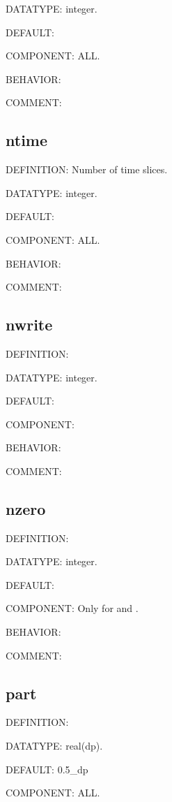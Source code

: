 {\color{green}DATATYPE:} integer.

{\color{blue}DEFAULT:}

{\color{brown}COMPONENT:} ALL.

{\color{purple}BEHAVIOR:}

{\color{olive}COMMENT:}

\subsection{ntime}
{\color{red}DEFINITION:} Number of time slices.

{\color{green}DATATYPE:} integer.

{\color{blue}DEFAULT:}

{\color{brown}COMPONENT:} ALL.

{\color{purple}BEHAVIOR:}

{\color{olive}COMMENT:}

\subsection{nwrite}
{\color{red}DEFINITION:}

{\color{green}DATATYPE:} integer.

{\color{blue}DEFAULT:}

{\color{brown}COMPONENT:}

{\color{purple}BEHAVIOR:}

{\color{olive}COMMENT:}

\subsection{nzero}
{\color{red}DEFINITION:}

{\color{green}DATATYPE:} integer.

{\color{blue}DEFAULT:}

{\color{brown}COMPONENT:} Only for {\begonia} and {\lavender}.

{\color{purple}BEHAVIOR:}

{\color{olive}COMMENT:}

\subsection{part}
{\color{red}DEFINITION:}

{\color{green}DATATYPE:} real(dp).

{\color{blue}DEFAULT:} 0.5\_dp

{\color{brown}COMPONENT:} ALL.


